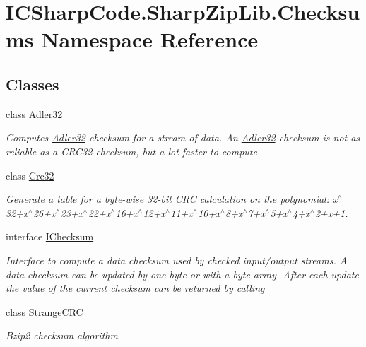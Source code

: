 \hypertarget{namespace_i_c_sharp_code_1_1_sharp_zip_lib_1_1_checksums}{}\section{I\+C\+Sharp\+Code.\+Sharp\+Zip\+Lib.\+Checksums Namespace Reference}
\label{namespace_i_c_sharp_code_1_1_sharp_zip_lib_1_1_checksums}
\subsection*{Classes}
\begin{DoxyCompactItemize}
\item 
class \hyperlink{class_i_c_sharp_code_1_1_sharp_zip_lib_1_1_checksums_1_1_adler32}{Adler32}
\begin{DoxyCompactList}\small\item\em Computes \hyperlink{class_i_c_sharp_code_1_1_sharp_zip_lib_1_1_checksums_1_1_adler32}{Adler32} checksum for a stream of data. An \hyperlink{class_i_c_sharp_code_1_1_sharp_zip_lib_1_1_checksums_1_1_adler32}{Adler32} checksum is not as reliable as a C\+R\+C32 checksum, but a lot faster to compute. \end{DoxyCompactList}\item 
class \hyperlink{class_i_c_sharp_code_1_1_sharp_zip_lib_1_1_checksums_1_1_crc32}{Crc32}
\begin{DoxyCompactList}\small\item\em Generate a table for a byte-\/wise 32-\/bit C\+RC calculation on the polynomial\+: x$^\wedge$32+x$^\wedge$26+x$^\wedge$23+x$^\wedge$22+x$^\wedge$16+x$^\wedge$12+x$^\wedge$11+x$^\wedge$10+x$^\wedge$8+x$^\wedge$7+x$^\wedge$5+x$^\wedge$4+x$^\wedge$2+x+1. \end{DoxyCompactList}\item 
interface \hyperlink{interface_i_c_sharp_code_1_1_sharp_zip_lib_1_1_checksums_1_1_i_checksum}{I\+Checksum}
\begin{DoxyCompactList}\small\item\em Interface to compute a data checksum used by checked input/output streams. A data checksum can be updated by one byte or with a byte array. After each update the value of the current checksum can be returned by calling \end{DoxyCompactList}\item 
class \hyperlink{class_i_c_sharp_code_1_1_sharp_zip_lib_1_1_checksums_1_1_strange_c_r_c}{Strange\+C\+RC}
\begin{DoxyCompactList}\small\item\em Bzip2 checksum algorithm \end{DoxyCompactList}\end{DoxyCompactItemize}

